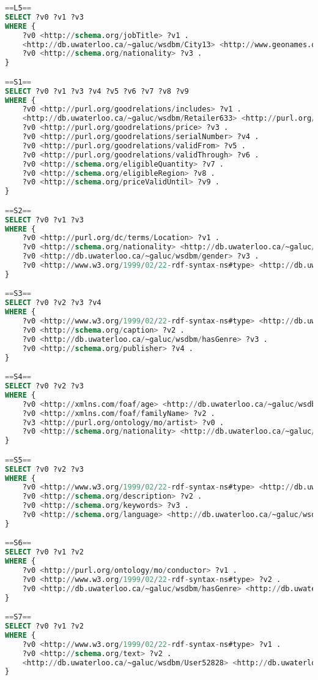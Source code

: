 \begin{lstlisting}[language=SQL, basicstyle=\ttfamily\scriptsize,morekeywords={PREFIX,OPTIONAL,FILTER,java,rdf,rdfs,url},label=watdiv-sparql-queries,basewidth=0.5em]
==L5==
SELECT ?v0 ?v1 ?v3 
WHERE {
    ?v0 <http://schema.org/jobTitle> ?v1 .
    <http://db.uwaterloo.ca/~galuc/wsdbm/City13> <http://www.geonames.org/ontology#parentCountry> ?v3 .
    ?v0 <http://schema.org/nationality> ?v3 .
}

==S1==
SELECT ?v0 ?v1 ?v3 ?v4 ?v5 ?v6 ?v7 ?v8 ?v9 
WHERE {
    ?v0 <http://purl.org/goodrelations/includes> ?v1 .
    <http://db.uwaterloo.ca/~galuc/wsdbm/Retailer633> <http://purl.org/goodrelations/offers> ?v0 .
    ?v0 <http://purl.org/goodrelations/price> ?v3 .
    ?v0 <http://purl.org/goodrelations/serialNumber> ?v4 .
    ?v0 <http://purl.org/goodrelations/validFrom> ?v5 .
    ?v0 <http://purl.org/goodrelations/validThrough> ?v6 .
    ?v0 <http://schema.org/eligibleQuantity> ?v7 .
    ?v0 <http://schema.org/eligibleRegion> ?v8 .
    ?v0 <http://schema.org/priceValidUntil> ?v9 .
}

==S2==
SELECT ?v0 ?v1 ?v3 
WHERE {
    ?v0 <http://purl.org/dc/terms/Location> ?v1 .
    ?v0 <http://schema.org/nationality> <http://db.uwaterloo.ca/~galuc/wsdbm/Country8> .
    ?v0 <http://db.uwaterloo.ca/~galuc/wsdbm/gender> ?v3 .
    ?v0 <http://www.w3.org/1999/02/22-rdf-syntax-ns#type> <http://db.uwaterloo.ca/~galuc/wsdbm/Role2> .
}

==S3==
SELECT ?v0 ?v2 ?v3 ?v4 
WHERE {
    ?v0 <http://www.w3.org/1999/02/22-rdf-syntax-ns#type> <http://db.uwaterloo.ca/~galuc/wsdbm/ProductCategory9> .
    ?v0 <http://schema.org/caption> ?v2 .
    ?v0 <http://db.uwaterloo.ca/~galuc/wsdbm/hasGenre> ?v3 .
    ?v0 <http://schema.org/publisher> ?v4 .
}

==S4==
SELECT ?v0 ?v2 ?v3 
WHERE {
    ?v0 <http://xmlns.com/foaf/age> <http://db.uwaterloo.ca/~galuc/wsdbm/AgeGroup0> .
    ?v0 <http://xmlns.com/foaf/familyName> ?v2 .
    ?v3 <http://purl.org/ontology/mo/artist> ?v0 .
    ?v0 <http://schema.org/nationality> <http://db.uwaterloo.ca/~galuc/wsdbm/Country1> .
}

==S5==
SELECT ?v0 ?v2 ?v3 
WHERE {
    ?v0 <http://www.w3.org/1999/02/22-rdf-syntax-ns#type> <http://db.uwaterloo.ca/~galuc/wsdbm/ProductCategory3> .
    ?v0 <http://schema.org/description> ?v2 .
    ?v0 <http://schema.org/keywords> ?v3 .
    ?v0 <http://schema.org/language> <http://db.uwaterloo.ca/~galuc/wsdbm/Language0> .
}

==S6==
SELECT ?v0 ?v1 ?v2 
WHERE {
    ?v0 <http://purl.org/ontology/mo/conductor> ?v1 .
    ?v0 <http://www.w3.org/1999/02/22-rdf-syntax-ns#type> ?v2 .
    ?v0 <http://db.uwaterloo.ca/~galuc/wsdbm/hasGenre> <http://db.uwaterloo.ca/~galuc/wsdbm/SubGenre90> .
}

==S7==
SELECT ?v0 ?v1 ?v2 
WHERE {
    ?v0 <http://www.w3.org/1999/02/22-rdf-syntax-ns#type> ?v1 .
    ?v0 <http://schema.org/text> ?v2 .
    <http://db.uwaterloo.ca/~galuc/wsdbm/User52828> <http://db.uwaterloo.ca/~galuc/wsdbm/likes> ?v0 .
}
\end{lstlisting}



